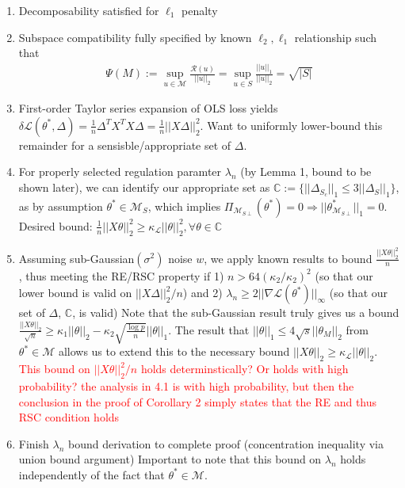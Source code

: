 \documentclass[11pt]{article}
\begin{document}
\begin{enumerate}
    \item Decomposability satisfied for $\ell_1$ penalty 
    \item Subspace compatibility fully specified by known $\ell_2, \ell_1$ relationship such that
    \begin{gather*} \Psi(M) := \sup_{u \in \mathcal{M}} \frac{\mathcal{R}(u)}{||u||_2} = \sup_{u \in S} \frac{||u||_1}{||u||_2} = \sqrt{|S|} \end{gather*}
    \item First-order Taylor series expansion of OLS loss yields $\delta\mathcal{L}(\theta^*, \Delta) = \frac{1}{n}\Delta^T X^TX\Delta = \frac{1}{n}||X\Delta||_2^2$. Want to uniformly lower-bound this remainder for a sensisble/appropriate set of $\Delta$.  
    \item For properly selected regulation paramter $\lambda_n$ (by Lemma 1, bound to be shown later), we can identify our appropriate set as $\mathbb{C} := \{||\Delta_{S_c}||_1 \leq 3||\Delta_S||_1\}$, as by assumption $\theta^* \in \mathcal{M}_S$, which implies $\Pi_{\mathcal{M}_{S\perp}}(\theta^*) = 0 \Rightarrow ||\theta^*_{\mathcal{M}_{S\perp}}||_1=0$. 
        \subitem Desired bound: $\frac{1}{n} ||X\theta||_2^2 \geq \kappa_{\mathcal{L}} ||\theta||_2^2, \forall \theta \in \mathbb{C}$
    \item Assuming sub-Gaussian$(\sigma^2)$ noise $w$, we apply known results to bound $\frac{||X\theta||_2^2}{n}$, thus meeting the RE/RSC property if 1) $n > 64(\kappa_2 / \kappa_2)^2$ (so that our lower bound is valid on $||X\Delta||_2^2/n$) and 2) $\lambda_n \geq 2||\nabla \mathcal{L}(\theta^*)||_\infty$ (so that our set of $\Delta$, $\mathbb{C}$, is valid)
        \subitem Note that the sub-Gaussian result truly gives us a bound $\frac{||X\theta||_2}{\sqrt{n}} \geq \kappa_1 ||\theta||_2 - \kappa_2\sqrt{\frac{\log p}{n}}||\theta||_1$. The result that $||\theta||_1 \leq 4\sqrt{s}||\theta_M||_2$ from $\theta^* \in \mathcal{M}$ allows us to extend this to the necessary bound $||X\theta||_2 \geq \kappa_\mathcal{L} ||\theta||_2$. 
        \subitem \textcolor{red}{This bound on $||X\theta||_2^2 / n$ holds determinstically? Or holds with high probability? the analysis in 4.1 is with high probability, but then the conclusion in the proof of Corollary 2 simply states that the RE and thus RSC condition holds}

    \item Finish $\lambda_n$ bound derivation to complete proof (concentration inequality via union bound argument)
        \subitem Important to note that this bound on $\lambda_n$ holds independently of the fact that $\theta^*\in \mathcal{M}$. 
    \end{enumerate}
    
\end{document}
